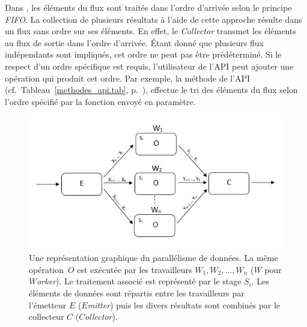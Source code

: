 Dans , les \'el\'ements du flux sont trait\'es dans l'ordre d'arriv\'ee selon le principe \emph{FIFO}. La collection de plusieurs r\'esultats \`a l'aide de cette approche r\'esulte dans un flux sans ordre sur ses \'el\'ements. En effet, le \emph{Collector} transmet les \'el\'ements au flux de sortie dans l'ordre d'arriv\'ee. \'Etant donn\'e que plusieurs flux ind\'ependants sont impliqu\'es, cet ordre ne peut pas \^etre pr\'ed\'etermin\'e. Si le respect d'un  ordre sp\'ecifique est requis, l'utilisateur de l'API peut ajouter une op\'eration qui produit cet ordre. Par exemple, la m\'ethode  de l'API (cf.~Tableau~\ref{methodes_api.tab}, p.~\pageref{sort.page}), effectue le tri des \'el\'ements du flux selon l'ordre sp\'ecifi\'e par la fonction  envoy\'e en param\`etre.

\begin{figure}
\centering
     \includegraphics[width=1.0\textwidth]{Figures/DataParallelisme.jpg}
      \caption[Une repr\'esentation graphique du parall\'elisme de donn\'ees en \ppff.]{Une repr\'esentation graphique du parall\'elisme de donn\'ees. La m\^eme op\'eration~$O$ est ex\'ecut\'ee par les travailleurs $W_1, W_2,\ldots, W_n$ ($W$ pour \emph{$W$orker}). Le traitement associ\'e est repr\'esent\'e par le stage $S_i$. Les \'el\'ements de donn\'ees sont r\'epartis entre les travailleurs par l'\'emetteur $E$ ($E$\emph{mitter}) puis les divers r\'esultats sont combin\'es par le collecteur $C$ ($C$\emph{ollector}).}
       \label{DataParallelisme.fig}
\end{figure}


